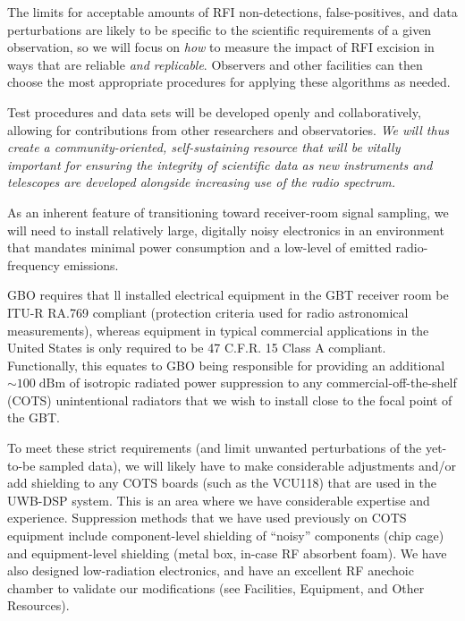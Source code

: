 \documentclass[10pt]{myNSF}
\begin{document}
The limits for acceptable amounts of RFI non-detections,
false-positives, and data perturbations are likely to be specific to
the scientific requirements of a given observation, so we will focus
on \emph{how} to measure the impact of RFI excision in ways that are
reliable \emph{and replicable}.  Observers and other facilities can
then choose the most appropriate procedures for applying these
algorithms as needed.

Test procedures and data sets will be developed openly and
collaboratively, allowing for contributions from other researchers and
observatories.  \emph{We will thus create a community-oriented,
  self-sustaining resource that will be vitally important for ensuring
  the integrity of scientific data as new instruments and telescopes
  are developed alongside increasing use of the radio spectrum.}


As an inherent feature of transitioning toward receiver-room signal
sampling, we will need to install relatively large, digitally noisy
electronics in an environment that mandates minimal power consumption
and a low-level of emitted radio-frequency emissions.

GBO requires that ll installed electrical equipment in the GBT
receiver room be ITU-R RA.769 compliant (protection criteria used for
radio astronomical measurements), whereas equipment in typical
commercial applications in the United States is only required to be 47
C.F.R. 15 Class A compliant. Functionally, this equates to GBO being
responsible for providing an additional $\sim 100\; \mathrm{dBm}$ of
isotropic radiated power suppression to any commercial-off-the-shelf
(COTS) unintentional radiators that we wish to install close to the
focal point of the GBT.  

To meet these strict requirements (and limit unwanted perturbations of
the yet-to-be sampled data), we will likely have to make considerable
adjustments and/or add shielding to any COTS boards (such as the
VCU118) that are used in the UWB-DSP system.  This is an area where we
have considerable expertise and experience. Suppression methods that
we have used previously on COTS equipment include component-level
shielding of ``noisy'' components (chip cage) and equipment-level
shielding (metal box, in-case RF absorbent foam). We have also
designed low-radiation electronics, and have an excellent RF anechoic
chamber to validate our modifications (see Facilities, Equipment, and
Other Resources).
\end{document}
